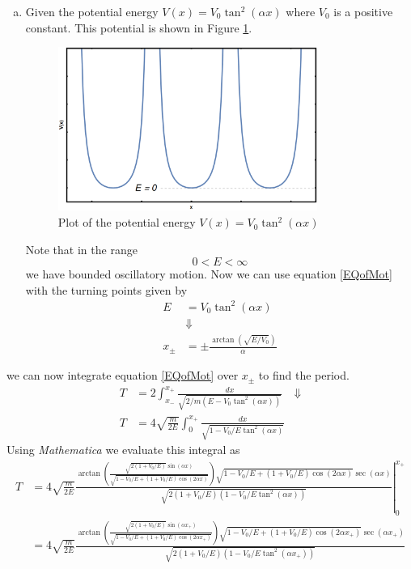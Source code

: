 \documentclass[11pt]{article}
\numberwithin{equation}{section}
\begin{document}
\begin{enumerate}[(a)]
\item Given the potential energy $V(x) = V_0\tan^2(\alpha x)$ where $V_0$ is a positive 
constant. This potential is shown in Figure \ref{Prob2c}.
\begin{figure}
\centering
\includegraphics[width=0.8\textwidth,keepaspectratio]{Images/Problem2c.png}
\caption{Plot of the potential energy $V(x) = V_0\tan^2(\alpha x)$}
\label{Prob2c}
\end{figure}
Note that in the range
$$0<E<\infty$$
we have bounded oscillatory motion. Now we can use equation \ref{EQofMot} with the turning
points given by 
\begin{align*}
E &= V_0\tan^2(\alpha x)\\
&\Downarrow\\
x_{\pm} &= \pm \frac{\arctan\left(\sqrt{E/V_0}\right)}{\alpha}
\end{align*}
\end{enumerate}
we can now integrate equation \ref{EQofMot} over $x_{\pm}$ to find the period.
\begin{align*}
T &= 2\int_{x_-}^{x_+}\frac{dx}{\sqrt{2/m(E-V_0\tan^2(\alpha x))}}
&\Downarrow\\
T &= 4\sqrt{\frac{m}{2E}}\int_{0}^{x_+}\frac{dx}{\sqrt{1-V_0/E\tan^2(\alpha x)}}
\end{align*}
Using \emph{Mathematica} we evaluate this integral as
\begin{align*}
T &= 4\sqrt{\frac{m}{2E}}\left.\frac{\arctan\left(\frac{\sqrt{2(1+V_0/E)}\sin(\alpha x)}{\sqrt{1-V_0/E+(1+V_0/E)\cos(2\alpha x)}}\right)\sqrt{1-V_0/E+(1+V_0/E)\cos(2\alpha x)}\sec(\alpha x)}{\sqrt{2(1+V_0/E)(1-V_0/E\tan^2(\alpha x))}}\right|_{0}^{x_+}\\
&= 4\sqrt{\frac{m}{2E}}\frac{\arctan\left(\frac{\sqrt{2(1+V_0/E)}\sin(\alpha x_+)}{\sqrt{1-V_0/E+(1+V_0/E)\cos(2\alpha x_+)}}\right)\sqrt{1-V_0/E+(1+V_0/E)\cos(2\alpha x_+)}\sec(\alpha x_+)}{\sqrt{2(1+V_0/E)(1-V_0/E\tan^2(\alpha x_+))}}\\
\end{align*}
\end{document}
